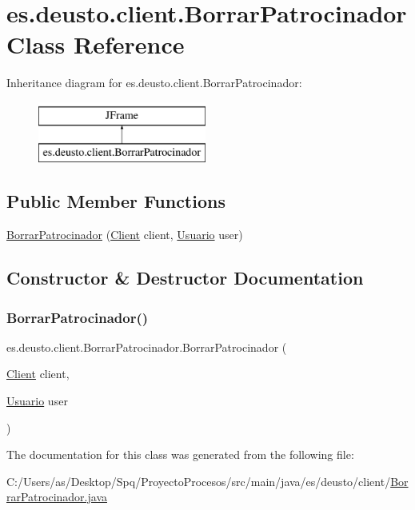 \hypertarget{classes_1_1deusto_1_1client_1_1_borrar_patrocinador}{}\section{es.\+deusto.\+client.\+Borrar\+Patrocinador Class Reference}
\label{classes_1_1deusto_1_1client_1_1_borrar_patrocinador}
Inheritance diagram for es.\+deusto.\+client.\+Borrar\+Patrocinador\+:\begin{figure}[H]
\begin{center}
\leavevmode
\includegraphics[height=2.000000cm]{classes_1_1deusto_1_1client_1_1_borrar_patrocinador}
\end{center}
\end{figure}
\subsection*{Public Member Functions}
\begin{DoxyCompactItemize}
\item 
\mbox{\hyperlink{classes_1_1deusto_1_1client_1_1_borrar_patrocinador_a548f7d483b83e58660b9ed0c0aa2dac2}{Borrar\+Patrocinador}} (\mbox{\hyperlink{classes_1_1deusto_1_1client_1_1_client}{Client}} client, \mbox{\hyperlink{classes_1_1deusto_1_1server_1_1jdo_1_1_usuario}{Usuario}} user)
\end{DoxyCompactItemize}


\subsection{Constructor \& Destructor Documentation}
\mbox{\label{classes_1_1deusto_1_1client_1_1_borrar_patrocinador_a548f7d483b83e58660b9ed0c0aa2dac2}} 
\subsubsection{\texorpdfstring{BorrarPatrocinador()}{BorrarPatrocinador()}}
{\footnotesize\ttfamily es.\+deusto.\+client.\+Borrar\+Patrocinador.\+Borrar\+Patrocinador (\begin{DoxyParamCaption}\item[{\mbox{\hyperlink{classes_1_1deusto_1_1client_1_1_client}{Client}}}]{client,  }\item[{\mbox{\hyperlink{classes_1_1deusto_1_1server_1_1jdo_1_1_usuario}{Usuario}}}]{user }\end{DoxyParamCaption})}



The documentation for this class was generated from the following file\+:\begin{DoxyCompactItemize}
\item 
C\+:/\+Users/as/\+Desktop/\+Spq/\+Proyecto\+Procesos/src/main/java/es/deusto/client/\mbox{\hyperlink{_borrar_patrocinador_8java}{Borrar\+Patrocinador.\+java}}\end{DoxyCompactItemize}

